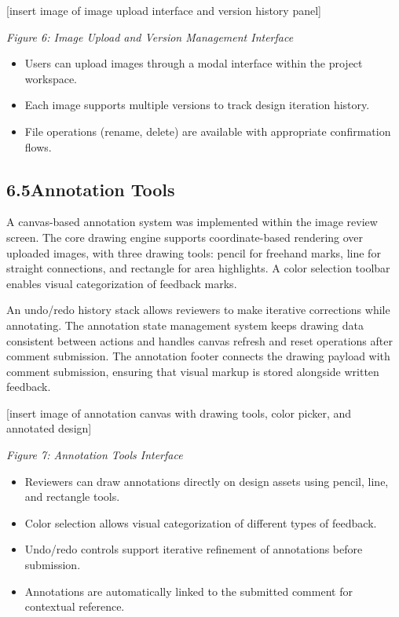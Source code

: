 \documentclass[12pt,a4paper]{article}
\begin{document}
[insert image of image upload interface and version history panel]

\textit{Figure 6: Image Upload and Version Management Interface}

\begin{itemize}
    \item Users can upload images through a modal interface within the project workspace.
    \item Each image supports multiple versions to track design iteration history.
    \item File operations (rename, delete) are available with appropriate confirmation flows.
\end{itemize}

\subsection{6.5\quad Annotation Tools}

A canvas-based annotation system was implemented within the image review screen. The core drawing engine supports coordinate-based rendering over uploaded images, with three drawing tools: pencil for freehand marks, line for straight connections, and rectangle for area highlights. A color selection toolbar enables visual categorization of feedback marks.

An undo/redo history stack allows reviewers to make iterative corrections while annotating. The annotation state management system keeps drawing data consistent between actions and handles canvas refresh and reset operations after comment submission. The annotation footer connects the drawing payload with comment submission, ensuring that visual markup is stored alongside written feedback.

[insert image of annotation canvas with drawing tools, color picker, and annotated design]

\textit{Figure 7: Annotation Tools Interface}

\begin{itemize}
    \item Reviewers can draw annotations directly on design assets using pencil, line, and rectangle tools.
    \item Color selection allows visual categorization of different types of feedback.
    \item Undo/redo controls support iterative refinement of annotations before submission.
    \item Annotations are automatically linked to the submitted comment for contextual reference.
\end{itemize}
\end{document}
